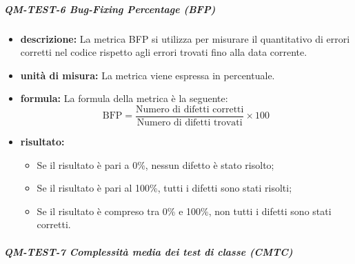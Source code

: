             \subparagraph{QM-TEST-6 Bug-Fixing Percentage (BFP)}
            \begin{itemize}
                \item \textbf{descrizione: }
                La metrica BFP si utilizza per misurare il quantitativo di errori corretti nel codice rispetto agli errori trovati fino alla data corrente.

                \item \textbf{unità di misura: }
                La metrica viene espressa in percentuale.

                \item \textbf{formula: }
                La formula della metrica è la seguente:
                \[
                    \text{BFP} = \frac{\text{Numero di difetti corretti}}{\text{Numero di difetti trovati}} \times 100
                \]

                \item \textbf{risultato: }
                \begin{itemize}
                    \item Se il risultato è pari a 0\%, nessun difetto è stato risolto;
                    \item Se il risultato è pari al 100\%, tutti i difetti sono stati risolti;
                    \item Se il risultato è compreso tra 0\% e 100\%, non tutti i difetti sono stati corretti.
                \end{itemize}
            \end{itemize}
    

            \subparagraph{QM-TEST-7 Complessità media dei test di classe (CMTC)}

